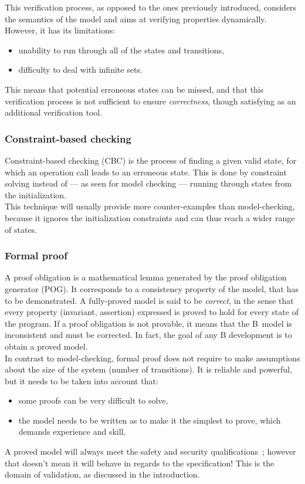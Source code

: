 This verification process, as opposed to the ones previously introduced, considers the semantics of the model and aims at verifying properties dynamically. However, it has its limitations:
\begin{itemize}
\item unability to run through all of the states and transitions,
\item difficulty to deal with infinite sets.
\end{itemize}
This means that potential erroneous states can be missed, and that this verification process is not sufficient to ensure {\itshape correctness}, though satisfying as an additional verification tool.

\subsubsection{Constraint-based checking}

Constraint-based checking (CBC) is the process of finding a given valid state, for which an operation call leads to an erroneous state. This is done by constraint solving instead of --- as seen for model checking --- running through states from the initialization.\\
This technique will usually provide more counter-examples than model-checking, because it ignores the initialization constraints and can thus reach a wider range of states.

\subsubsection{Formal proof}
A proof obligation is a mathematical lemma generated by the proof obligation generator (POG). It corresponds to a consistency property of the model, that has to be demonstrated.
A fully-proved model is said to be {\itshape correct}, in the sense that every property (invariant, assertion) expressed is proved to hold for every state of the program. If a proof obligation is not provable, it means that the B~model is inconsistent and must be corrected. In fact, the goal of any B development is to obtain a proved model.\\
In contrast to model-checking, formal proof does not require to make assumptions about the size of the system (number of transitions). It is reliable and powerful, but it needs to be taken into account that:
\begin{itemize}
\item some proofs can be very difficult to solve,
\item the model needs to be written as to make it the simplest to prove, which demands experience and skill.
\end{itemize}
A proved model will always meet the safety and security qualifications~; however that doesn't mean it will behave in regards to the specification! This is the domain of validation, as discussed in the introduction.

